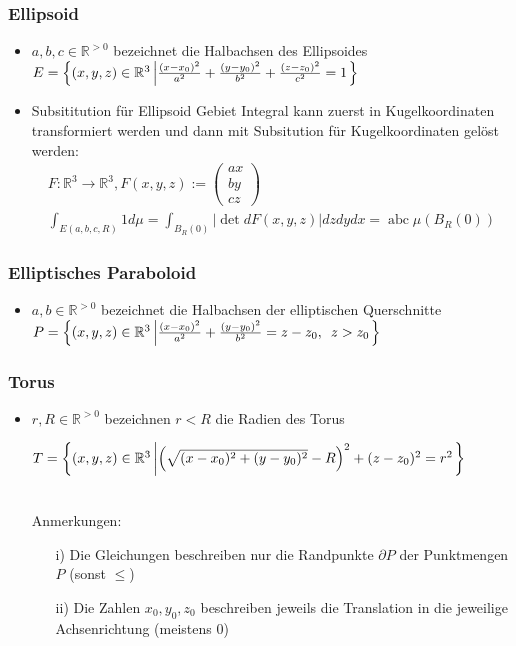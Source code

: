 \documentclass[a3paper, 11pt, landscape]{scrartcl}
\begin{document}
\begin{multicols*}{3}
	\subsubsection{Ellipsoid}
	\begin{itemize}
	    \item $a, b, c \in \mathbb{R}^{>0}$ bezeichnet die Halbachsen des Ellipsoides
		$E=\left\{(x, y, z)\in \mathbb{R}^3 \large \left \vert  \frac{(x-x_0)^2}{a^2}+\frac{(y-y_0)^2}{b^2} +\frac{(z-z_0)^2}{c^2}= 1 \right. \right\}$
		\item Subsititution für Ellipsoid Gebiet Integral kann zuerst in Kugelkoordinaten transformiert werden und dann mit Subsitution für Kugelkoordinaten gelöst werden: $$\begin{gathered}
F: \mathbb{R}^{3} \rightarrow \mathbb{R}^{3}, F(x, y, z):=\left(\begin{array}{c}
a x \\
b y \\
c z
\end{array}\right) \\
\int_{E(a, b, c, R)} 1 d \mu=\int_{B_{R}(0)}|\operatorname{det} d F(x, y, z)| d z d y d x=\operatorname{abc }\mu\left(B_{R}(0)\right)
\end{gathered}$$
	\end{itemize}
		
	\subsubsection{Elliptisches Paraboloid}
	\begin{itemize}
	    \item $a, b \in \mathbb{R}^{>0}$ bezeichnet die Halbachsen der elliptischen Querschnitte
		$P=\left\{(x, y, z)\in \mathbb{R}^3 \large \left \vert  \frac{(x-x_0)^2}{a^2}+\frac{(y-y_0)^2}{b^2}= z-z_0, \hspace{5pt} z>z_0 \right. \right\}$
	\end{itemize}
		
	\subsubsection{Torus}
	\begin{itemize}
	    \item $r, R \in \mathbb{R}^{>0}$ bezeichnen $r<R$ die Radien des Torus
		\begin{small}
			$T=\left\{(x, y, z)\in \mathbb{R}^3 \large \left \vert  \left( \sqrt{(x-x_0)^2+(y-y_0)^2}-R\right)^2 +(z-z_0)^2=r^2 \right. \right\}$
		\end{small}\\
	Anmerkungen:
	\begin{itemize}
		\item[i)] Die Gleichungen beschreiben nur die Randpunkte $\partial P$ der Punktmengen $P$ (sonst $\le$)
		\item[ii)] Die Zahlen $x_0, y_0, z_0$ beschreiben jeweils die Translation in die jeweilige Achsenrichtung (meistens 0)
	\end{itemize}
	\end{itemize}
		

\end{multicols*}
\end{document}
